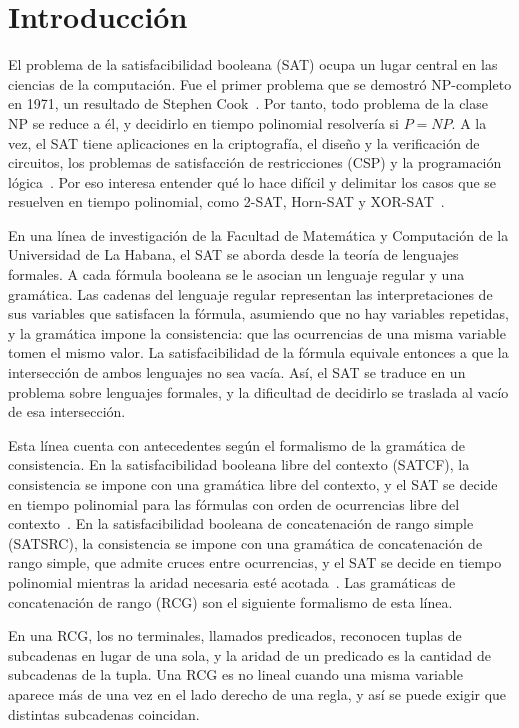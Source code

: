 \documentclass{report}
\begin{document}
\chapter*{Introducción}

El problema de la satisfacibilidad booleana (SAT) ocupa un lugar central
en las ciencias de la computación. Fue el primer problema que se demostró
NP-completo en 1971, un resultado de Stephen Cook~\cite{cook1971}. Por
tanto, todo problema de la clase NP se
reduce a él, y decidirlo en tiempo polinomial resolvería si $P = NP$. A la vez, el SAT tiene aplicaciones en la criptografía, el diseño y la
verificación de circuitos, los problemas de satisfacción de restricciones
(CSP) y la programación lógica~\cite{gu1997sat}.
Por eso interesa entender qué lo hace difícil y delimitar los casos que
se resuelven en tiempo polinomial, como 2-SAT, Horn-SAT y
XOR-SAT~\cite{schaefer1978}.

En una línea de investigación de la Facultad de Matemática y Computación
de la Universidad de La Habana, el SAT se aborda desde la teoría de
lenguajes formales. A cada fórmula booleana se le asocian un lenguaje
regular y una gramática. Las cadenas del lenguaje regular representan
las interpretaciones de sus variables que satisfacen la fórmula,
asumiendo que no hay variables repetidas, y la gramática impone la
consistencia: que las ocurrencias de una misma variable tomen el mismo
valor. La satisfacibilidad de la fórmula
equivale entonces a que la intersección de ambos lenguajes no sea vacía.
Así, el SAT se traduce en un problema sobre lenguajes formales, y la
dificultad de decidirlo se traslada al vacío de esa intersección.

Esta línea cuenta con antecedentes según el formalismo de la gramática de
consistencia. En la satisfacibilidad booleana libre del contexto (SATCF),
la consistencia se impone con una gramática libre del contexto, y el SAT
se decide en tiempo polinomial para las fórmulas con orden de ocurrencias
libre del contexto~\cite{fernandezarias2007}. En la satisfacibilidad
booleana de concatenación de rango simple (SATSRC), la consistencia se
impone con una gramática de concatenación de rango simple, que admite
cruces entre ocurrencias, y el SAT se decide en tiempo polinomial
mientras la aridad necesaria esté acotada~\cite{aguileralopez2016}. Las
gramáticas de concatenación de rango (RCG) son el siguiente formalismo de
esta línea.

En una RCG, los no terminales, llamados predicados, reconocen tuplas
de subcadenas en lugar de una sola, y la aridad de un predicado es la
cantidad de subcadenas de la tupla. Una RCG es no lineal cuando una
misma variable aparece más de una vez en el lado derecho de una regla,
y así se puede exigir que distintas subcadenas coincidan.
\end{document}
